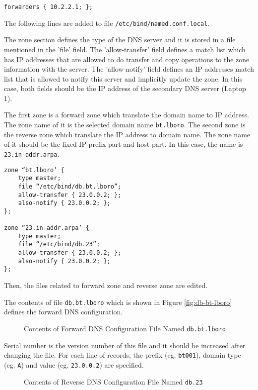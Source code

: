 \begin{lstlisting}
forwarders { 10.2.2.1; };
\end{lstlisting}



The following lines are added to file \texttt{/etc/bind/named.conf.local}.

The zone section defines the type of the DNS server and it is stored in a file mentioned in the 'file' field. 
The 'allow-transfer' field defines a match list which has IP addresses that are allowed to do transfer and copy operations to the zone information with the server. 
The 'allow-notify' field defines an IP addresses match list that is allowed to notify this server and implicitly update the zone.
In this case, both fields should be the IP address of the secondary DNS server (Laptop 1).

The first zone is a forward zone which translate the domain name to IP address. The zone name of it is the selected domain name \texttt{bt.lboro}. 
The second zone is the reverse zone which translate the IP address to domain name. The zone name of it should be the fixed IP prefix part and host part. In this case, the name is \texttt{23.in-addr.arpa}.


\begin{lstlisting}
zone “bt.lboro’ {
	type master;
	file “/etc/bind/db.bt.lboro”;
	allow-transfer { 23.0.0.2; };
	also-notify { 23.0.0.2; };
};

zone “23.in-addr.arpa’ {
	type master;
	file “/etc/bind/db.23”;
	allow-transfer { 23.0.0.2; };
	also-notify { 23.0.0.2; };
};
\end{lstlisting}

Then, the files related to forward zone and reverse zone are edited. 

The contents of file \texttt{db.bt.lboro} which is shown in Figure \ref{fig:db-bt-lboro} defines the forward DNS configuration.

\begin{figure*}[ht!]
\caption{Contents of Forward DNS Configuration File Named \texttt{db.bt.lboro}}
\end{figure*}


Serial number is the version number of this file and it should be increased after changing the file. 
For each line of records, the prefix (eg. \texttt{bt001}), domain type (eg. \texttt{A}) and value (eg. \texttt{23.0.0.2}) are specified.


\begin{figure*}[ht!]
\caption{Contents of Reverse DNS Configuration File Named \texttt{db.23}}
\end{figure*}

